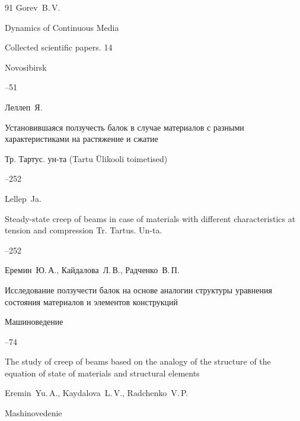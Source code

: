 \begin{thebibliography}{91}
\by Gorev~B.\,V.

\inbook Dynamics of Continuous Media 

\bookinfo Collected scientific papers. 14

\publaddr Novosibirsk


--51






\by Леллеп~Я.

\paper Установившаяся ползучесть балок в случае материалов с разными характеристиками на растяжение и сжатие

\jour Тр. Тартус.  ун-та (Tartu \"Ulikooli toimetised)




--252

\misctransl 

\by Lellep~Ja.

\paper Steady-state creep of beams in case of materials with different characteristics at tension and compression \jour Tr. Tartus. Un-ta. 



--252 







\by Еремин~Ю.\,А., Кайдалова~Л.\,В., Радченко~В.\,П.

\paper Исследование ползучести балок на основе аналогии структуры уравнения состояния материалов и элементов конструкций

\jour  Машиноведение



--74

\misctransl

\paper The study of creep of beams based on the analogy of the structure of the equation of state of materials and structural elements

\by Eremin~Yu.\,A., Kaydalova~L.\,V., Radchenko~V.\,P.

\jour  Mashinovedenie



\end{thebibliography}
